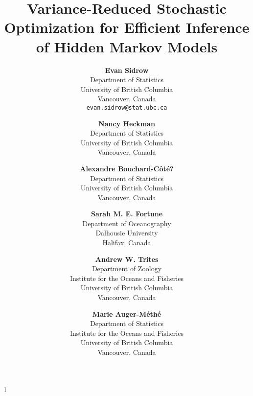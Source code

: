 \documentclass[12pt]{article}
\newcommand{\blind}{1}
\begin{document}
%

\def\spacingset#1{\renewcommand{\baselinestretch}%
{#1}\small\normalsize} \spacingset{1}


\blind
{
    \title{Variance-Reduced Stochastic Optimization for Efficient Inference of Hidden Markov Models}

    \author{
      \textbf{Evan Sidrow} \\
      Department of Statistics \\
      University of British Columbia\\
      Vancouver, Canada \\
      \texttt{evan.sidrow@stat.ubc.ca} \\
      \and
      \textbf{Nancy Heckman} \\
      Department of Statistics \\
      University of British Columbia \\
      Vancouver, Canada \\
      \and
      \textbf{Alexandre Bouchard-C\^ot\'e?} \\
      Department of Statistics \\
      University of British Columbia \\
      Vancouver, Canada \\
      \and
      \textbf{Sarah M. E. Fortune} \\
      Department of Oceanography \\
      Dalhousie University \\
      Halifax, Canada \\
      \and
      \textbf{Andrew W. Trites} \\
      Department of Zoology \\
      Institute for the Oceans and Fisheries \\
      University of British Columbia \\
      Vancouver, Canada \\
      \and
      \textbf{Marie Auger-M\'eth\'e} \\
      Department of Statistics \\
      Institute for the Oceans and Fisheries \\
      University of British Columbia \\
      Vancouver, Canada \\
    }
    \maketitle
} \fi
\end{document}
